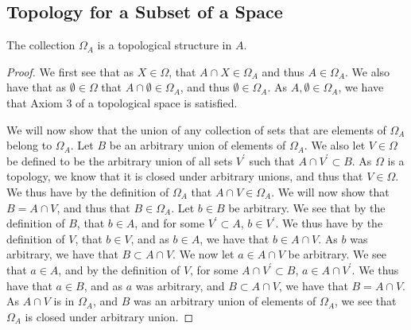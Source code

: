 \subsection{Topology for a Subset of a Space}

\begin{majorEx}%
The collection $\Omega_A$ is a topological structure in $A$.
\end{majorEx}
\begin{proof}
  We first see that as $X\in \Omega$, that $A\cap X \in \Omega_A$ and
  thus $A\in \Omega_A$. We also have that as $\emptyset \in \Omega$
  that $A\cap \emptyset \in \Omega_A$, and thus $\emptyset \in
  \Omega_A$. As $A,\emptyset \in \Omega_A$, we have that Axiom 3 of a
  topological space is satisfied.

  We will now show that the union of any collection of sets that are
  elements of $\Omega_A$ belong to $\Omega_A$. Let $B$ be an arbitrary
  union of elements of $\Omega_A$. We also let $V\in \Omega$ be defined to be
  the arbitrary union of all sets $V^\prime$ such that 
  $A\cap V^\prime \subset B$. As $\Omega$ is a topology, we know that
  it is closed under arbitrary unions, and thus that $V\in \Omega$. We
  thus have by the definition of $\Omega_A$ that $A\cap V\in
  \Omega_A$. We will now show that $B =A\cap V$, 
  and thus that $B\in \Omega_A$.
  Let $b\in B$ be arbitrary.
  We see that by the definition of $B$, that $b\in A$,
  and for some $V^\prime\subset A$, $b\in V^\prime$.
  We thus have by the definition of $V$, that $b \in V$, and as $b\in
  A$, we have that $b \in A \cap V$. As $b$ was arbitrary, we have
  that $B \subset A \cap V$. We now let $a \in A \cap V$ be
  arbitrary. We see that $a\in A$, and by the definition of $V$, for
  some $A\cap V^\prime\subset B$, $a \in A\cap V^\prime$. We thus have
  that $a \in B$, and as $a$ was arbitrary, and $B \subset A \cap V$,
  we have that $B = A \cap V$. As $A \cap V$ is in $\Omega_A$, and $B$
  was an arbitrary union of elements of  $\Omega_A$, we see that
  $\Omega_A$ is closed under arbitrary union.


\end{proof}
